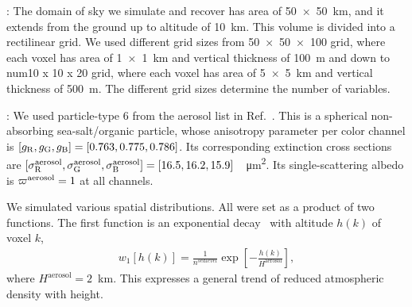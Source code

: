 \documentclass[10pt,letterpaper]{article}
\begin{document}
: The domain of sky we simulate and recover
has area of \SI{50 x 50}{\km}, and it extends from the ground up to
altitude of \SI{10}{\km}. This volume is divided into a rectilinear
grid. We used different grid sizes from \num{50 x 50 x 100} grid,
where each voxel has area of \SI{1 x 1}{\km} and vertical thickness of
\SI{100}{\metre} and down to num{10 x 10 x 20} grid, where each voxel
has area of \SI{5 x 5}{\km} and vertical thickness of
\SI{500}{\metre}. The different grid sizes determine the number of
variables.

: We used particle-type 6 from the aerosol list
in Ref.~\cite{Martonchik2009}. This is a spherical non-absorbing
sea-salt/organic particle, whose anisotropy parameter per color
channel is $[g_{\rm R},g_{\rm G},g_{\rm B}]=[0.763,0.775,0.786]$. Its
corresponding extinction cross sections are $[\sigma^{\rm
  aerosol}_{\rm R}, \sigma^{\rm aerosol}_{\rm G}, \sigma^{\rm
  aerosol}_{\rm
  B}]=[16.5,16.2,15.9]$~\si[sticky-per]{\per\micro\meter\squared}.
Its single-scattering albedo is $\varpi^{\rm aerosol}=1$ at all
channels.

We simulated various spatial distributions. All were set as a product
of two functions. The first function is an exponential
decay~\cite{Levi1980} with altitude $h(k)$ of voxel $k$,
\begin{align}
  w_1[h(k)] = \frac{1} {n^{sea level}}
  \exp\left[-\frac{h(k)}{H^\mathrm{aerosol}}\right],
\end{align}
where $H^\mathrm{aerosol}=2$~\si{\km}. This expresses a general trend
of reduced atmospheric density with height.
\end{document}
